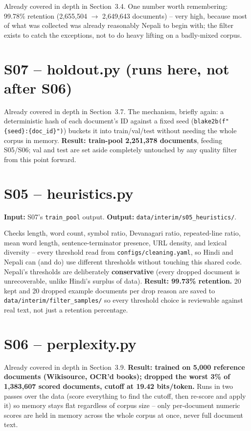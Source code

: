 \documentclass[11pt]{report}
\begin{document}
Already covered in depth in Section~3.4. One number worth remembering:
99.78\% retention (2,655,504 $\to$ 2,649,643 documents) -- very high,
because most of what was collected was already reasonably Nepali to
begin with; the filter exists to catch the exceptions, not to do heavy
lifting on a badly-mixed corpus.

\section{S07 -- holdout.py (runs here, not after S06)}

Already covered in depth in Section~3.7. The mechanism, briefly again: a
deterministic hash of each document's ID against a fixed seed
(\texttt{blake2b(f"\{seed\}:\{doc\_id\}")}) buckets it into train/val/test
without needing the whole corpus in memory. \textbf{Result: train-pool
2,251,378 documents}, feeding S05/S06; val and test are set aside
completely untouched by any quality filter from this point forward.

\section{S05 -- heuristics.py}

\textbf{Input:} S07's \texttt{train\_pool} output. \textbf{Output:}
\texttt{data/interim/s05\_heuristics/}.

Checks length, word count, symbol ratio, Devanagari ratio, repeated-line
ratio, mean word length, sentence-terminator presence, URL density, and
lexical diversity -- every threshold read from
\texttt{configs/cleaning.yaml}, so Hindi and Nepali can (and do) use
different thresholds without touching this shared code. Nepali's
thresholds are deliberately \textbf{conservative} (every dropped document
is unrecoverable, unlike Hindi's surplus of data). \textbf{Result: 99.73\%
retention.} 20 kept and 20 dropped example documents per drop reason are
saved to \texttt{data/interim/filter\_samples/} so every threshold choice
is reviewable against real text, not just a retention percentage.

\section{S06 -- perplexity.py}

Already covered in depth in Section~3.9. \textbf{Result: trained on 5,000
reference documents (Wikisource, OCR'd books); dropped the worst 3\% of
1,383,607 scored documents, cutoff at 19.42 bits/token.} Runs in two
passes over the data (score everything to find the cutoff, then re-score
and apply it) so memory stays flat regardless of corpus size -- only
per-document numeric scores are held in memory across the whole corpus at
once, never full document text.
\end{document}
